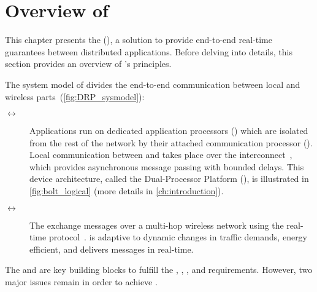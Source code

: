 
\section{Overview of \DRP}
\label{sec:design_overview}


This chapter presents the \DRPLong (\DRP), a solution to provide end-to-end real-time guarantees between distributed applications.
Before delving into details, this section provides an overview of \DRP's principles.

The system model of \DRP divides the end-to-end communication between local and wireless parts~(\cref{fig:DRP_sysmodel}):
\begin{description}
  \item[\AP  $\boldsymbol{\leftrightarrow}$ \CP]
  Applications run on dedicated application processors (\APs) which are isolated from the rest of the network by their attached communication processor (\CP).
  Local communication between \APs and \CPs  takes place over the \bolt interconnect~\cite{sutton2015Bolt}, which provides asynchronous message passing with bounded delays.
  This device architecture, called the Dual-Processor Platform (\DPP), is illustrated in \cref{fig:bolt_logical} (more details in \cref{ch:introduction}).

  \item[\CP  $\boldsymbol{\leftrightarrow}$ \CP]
  The \CPs exchange messages over a multi-hop wireless network using the \blink real-time protocol~\cite{zimmerling2017Blink}.
  \blink is adaptive to dynamic changes in traffic demands, energy efficient, and delivers messages in real-time.
\end{description}

The \DPP and \blink are key building blocks to fulfill the , , , and  requirements.
However, two major issues remain in order to achieve .

